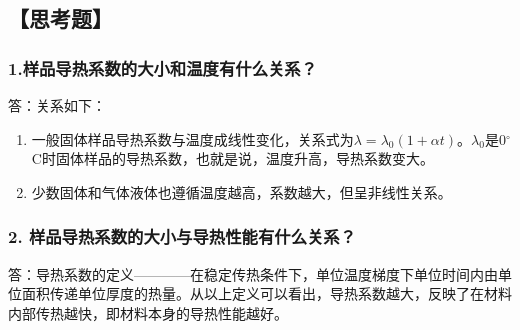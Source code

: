\documentclass[12pt,a4paper,UTF8]{ctexart}
\begin{document}
\subsection*{【思考题】}

	\subsubsection*{1.样品导热系数的大小和温度有什么关系？}
	答：关系如下：
	\begin{enumerate}[(1)]
			\item 一般固体样品导热系数与温度成线性变化，关系式为$\lambda=\lambda_0(1+\alpha t)$。$\lambda_0$是0$^{\circ}$C时固体样品的导热系数，也就是说，温度升高，导热系数变大。
			\item 少数固体和气体液体也遵循温度越高，系数越大，但呈非线性关系。
	\end{enumerate}

	\subsubsection*{2. 样品导热系数的大小与导热性能有什么关系？}
	答：导热系数的定义————在稳定传热条件下，单位温度梯度下单位时间内由单位面积传递单位厚度的热量。从以上定义可以看出，导热系数越大，反映了在材料内部传热越快，即材料本身的导热性能越好。
\end{document}
